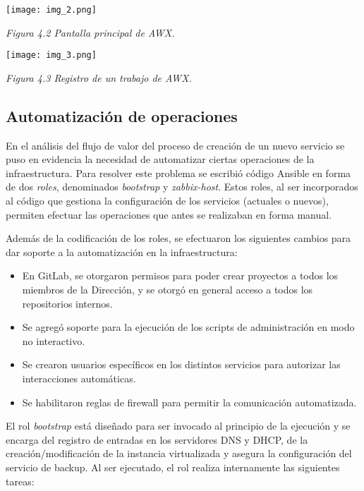 \texttt{[image: img\_2.png]}


\textit{Figura 4.2 Pantalla principal de AWX.}

\texttt{[image: img\_3.png]}


\textit{Figura 4.3 Registro de un trabajo de AWX.}

\subsection{Automatización de operaciones}

En el análisis del flujo de valor del proceso de creación de un nuevo servicio se puso en evidencia la necesidad de automatizar ciertas operaciones de la infraestructura. Para resolver este problema se escribió código Ansible en forma de dos \textit{roles}, denominados \textit{bootstrap} y \textit{zabbix-host}. Estos roles, al ser incorporados al código que gestiona la configuración de los servicios (actuales o nuevos), permiten efectuar las operaciones que antes se realizaban en forma manual.

Además de la codificación de los roles, se efectuaron los siguientes cambios para dar soporte a la automatización en la infraestructura:

\begin{itemize}
\item En GitLab, se otorgaron permisos para poder crear proyectos a todos los miembros de la Dirección, y se otorgó en general acceso a todos los repositorios internos.
\item Se agregó soporte para la ejecución de los scripts de administración en modo no interactivo.
\item Se crearon usuarios específicos en los distintos servicios para autorizar las interacciones automáticas.
\item Se habilitaron reglas de firewall para permitir la comunicación automatizada.
\end{itemize}
El rol \textit{bootstrap} está diseñado para ser invocado al principio de la ejecución y se encarga del registro de entradas en los servidores DNS y DHCP, de la creación/modificación de la instancia virtualizada y asegura la configuración del servicio de backup. Al ser ejecutado, el rol realiza internamente las siguientes tareas:

